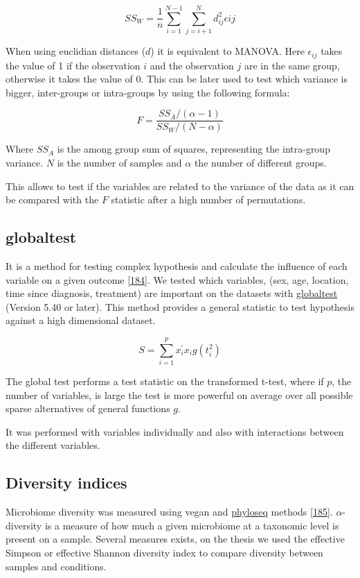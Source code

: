 \documentclass[
  12pt,
  a4paper,
  twoside,
  openright]{book}
\begin{document}
\[
SS_W = \frac{1}{n} \sum_{i=1}^{N-1}\sum_{j=i+1}^N d_{ij}^2\epsilon{ij} 
\]

When using euclidian distances (\(d\)) it is equivalent to MANOVA.
Here \(\epsilon_{ij}\) takes the value of 1 if the observation \(i\) and the observation \(j\) are in the same group, otherwise it takes the value of 0.
This can be later used to test which variance is bigger, inter-groups or intra-groups by using the following formula:

\[
F = \dfrac{SS_A/(\alpha -1)}{SS_W/(N-\alpha)}
\]

Where \(SS_A\) is the among group sum of squares, representing the intra-group variance.
\(N\) is the number of samples and \(\alpha\) the number of different groups.

This allows to test if the variables are related to the variance of the data as it can be compared with the \(F\) statistic after a high number of permutations.

\hypertarget{globaltest}{%
\subsection{globaltest}\label{globaltest}}

It is a method for testing complex hypothesis and calculate the influence of each variable on a given outcome {[}\protect\hyperlink{ref-goeman2006}{184}{]}.
We tested which variables, (sex, age, location, time since diagnosis, treatment) are important on the datasets with \href{https://bioconductor.org/packages/globaltest}{globaltest} (Version 5.40 or later).
This method provides a general statistic to test hypothesis against a high dimensional dataset.

\[
S = \sum_{i=1}^p x_i^{'} x_i g(t_i^2)
\]

The global test performs a test statistic on the transformed t-test, where if \(p\), the number of variables, is large the test is more powerful on average over all possible sparse alternatives of general functions \(g\).

It was performed with variables individually and also with interactions between the different variables.

\hypertarget{diversity-indices}{%
\subsection{Diversity indices}\label{diversity-indices}}

Microbiome diversity was measured using vegan and \href{https://bioconductor.org/packages/phyloseq}{phyloseq} methods {[}\protect\hyperlink{ref-oksanen2020}{185}{]}.
\(\alpha\)-diversity is a measure of how much a given microbiome at a taxonomic level is present on a sample.
Several measures exists, on the thesis we used the effective Simpson or effective Shannon diversity index to compare diversity between samples and conditions.
\end{document}

